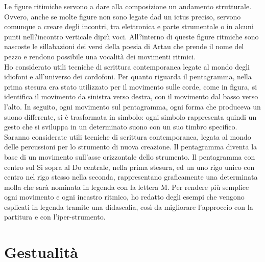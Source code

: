 Le figure ritimiche servono a dare alla composizione un andamento strutturale. Ovvero, anche se molte figure non sono legate dad un ictus preciso, servono comunque a creare degli incontri, tra elettronica e parte strumentale o in alcuni punti nell?incontro verticale dipiù voci. All?interno di queste figure ritmiche sono nascoste le sillabazioni dei versi della poesia di Artau che prende il nome del pezzo e rendono possibile una vocalità dei movimenti ritmici. \\
Ho considerato utili tecniche di scrittura contemporanea legate al mondo degli idiofoni e all'universo dei cordofoni. Per quanto riguarda il pentagramma, nella prima stesura era stato utilizzato per il movimento sulle corde, come in figura, si identifica il movimento da sinistra verso destra, con il movimento dal basso verso l'alto. In seguito, ogni movimento sul pentagramma, ogni forma che produceva un suono differente, si è trasformata in simbolo: ogni simbolo rappresenta quindi un gesto che si sviluppa in un determinato suono con un suo timbro specifico.
Saranno considerate utili tecniche di scrittura contemporanea, legata al mondo delle percussioni per lo strumento di nuova creazione. Il pentagramma diventa la base di un movimento sull'asse orizzontale dello strumento. Il pentagramma con centro sul Si sopra al Do centrale, nella prima stesura, ed un uno rigo unico con centro nel rigo stesso nella seconda, rappresentano graficamente una determinata molla che sarà nominata in legenda con la lettera M. Per rendere più semplice ogni movimento e ogni incastro ritmico, ho redatto degli esempi che vengono esplicati in legenda tramite una didascalia, così da migliorare l'approccio con la partitura e con l'iper-strumento.

\section{Gestualità}

